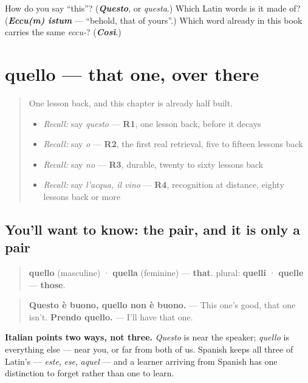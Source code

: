\begin{tcolorbox}[breakable,colback=teal!4,colframe=teal!35!black,title={Before you move on}]
How do you say \textquotedblleft{}this\textquotedblright{}? (\emph{\textbf{Questo}}, or \emph{questa}.) Which Latin words is it made of? (\emph{\textbf{Eccu(m) istum}} — \textquotedblleft{}behold, that of yours\textquotedblright{}.) Which word already in this book carries the same \emph{eccu-}? (\emph{\textbf{Così}}.)
\end{tcolorbox}
\section[quello]{quello — that one, over there}

\label{lesson:IT-C33-quello}



\begin{quote}
One lesson back, and this chapter is already half built.

\begin{itemize}
\raggedright
  \item \emph{Recall:} say \emph{questo} — \textbf{R1}, one lesson back, before it decays
  \item \emph{Recall:} say \emph{o} — \textbf{R2}, the first real retrieval, five to fifteen lessons back
  \item \emph{Recall:} say \emph{no} — \textbf{R3}, durable, twenty to sixty lessons back
  \item \emph{Recall:} say \emph{l'acqua, il vino} — \textbf{R4}, recognition at distance, eighty lessons back or more
\end{itemize}
\end{quote}

\subsection*{You'll want to know: the pair, and it is only a pair}
\begin{quote}
\textbf{quello} (masculine) · \textbf{quella} (feminine) — \textbf{that}. plural: \textbf{quelli} · \textbf{quelle} — \textbf{those}.
\end{quote}

\begin{quote}
\textbf{Questo è buono, quello non è buono.} — This one's good, that one isn't. \textbf{Prendo quello.} — I'll have that one.
\end{quote}

\textbf{Italian points two ways, not three.} \emph{Questo} is near the speaker; \emph{quello} is everything else — near you, or far from both of us. Spanish keeps all three of Latin's — \emph{este}, \emph{ese}, \emph{aquel} — and a learner arriving from Spanish has one distinction to forget rather than one to learn.

